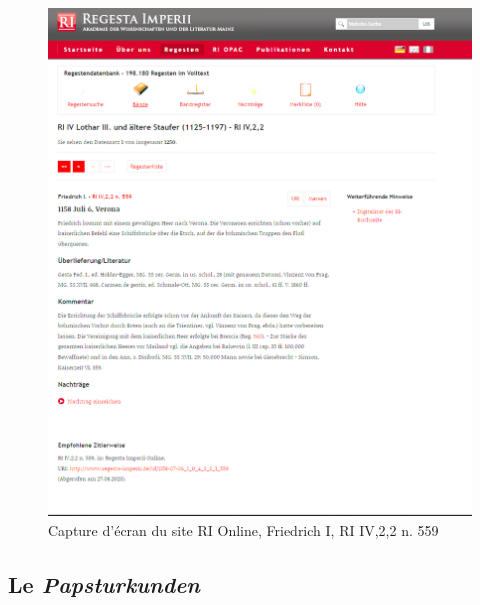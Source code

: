 \begin{figure}[h]
    \centering
    \includegraphics[width=12cm]{images/RI_online.png}
    \caption{Capture d'écran du site RI Online, Friedrich I, RI IV,2,2 n. 559}
    \label{fig:RIonline}
\end{figure}


    \subsection{Le \textit{Papsturkunden}}

